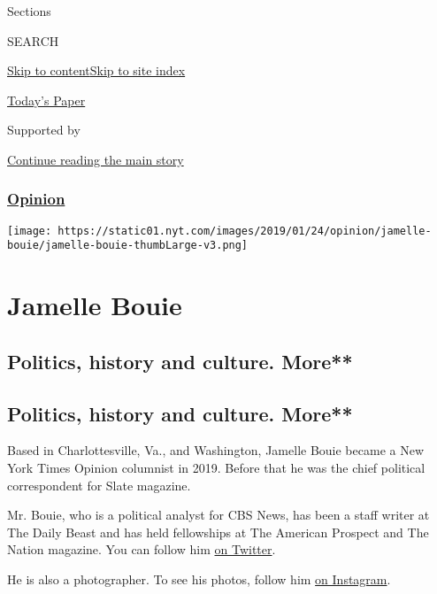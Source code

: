 Sections

SEARCH

\protect\hyperlink{site-content}{Skip to
content}\protect\hyperlink{site-index}{Skip to site index}

\href{https://myaccount.nytimes.com/auth/login?response_type=cookie\&client_id=vi}{}

\href{https://www.nytimes.com/section/todayspaper}{Today's Paper}

Supported by

\protect\hyperlink{after-sponsor}{Continue reading the main story}

\hypertarget{opinion}{%
\subsubsection{\texorpdfstring{\href{/section/opinion}{Opinion}}{Opinion}}\label{opinion}}

\texttt{[image: https://static01.nyt.com/images/2019/01/24/opinion/jamelle-bouie/jamelle-bouie-thumbLarge-v3.png]}

\hypertarget{jamelle-bouie}{%
\section{Jamelle Bouie}\label{jamelle-bouie}}

\hypertarget{politics-history-and-culture-more}{%
\subsection{Politics, history and culture.
More**}\label{politics-history-and-culture-more}}

\hypertarget{politics-history-and-culture-more-1}{%
\subsection{Politics, history and culture.
More**}\label{politics-history-and-culture-more-1}}

Based in Charlottesville, Va., and Washington, Jamelle Bouie became a
New York Times Opinion columnist in 2019. Before that he was the chief
political correspondent for Slate magazine.

Mr. Bouie, who is a political analyst for CBS News, has been a staff
writer at The Daily Beast and has held fellowships at The American
Prospect and The Nation magazine. You can follow him
\href{https://twitter.com/jbouie}{on Twitter}.

He is also a photographer. To see his photos, follow him
\href{https://www.instagram.com/jbouie/?hl=en}{on Instagram}.

